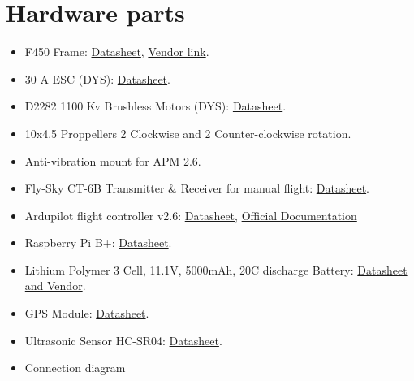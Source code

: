 \documentclass[a4paper,12pt,oneside]{book}
\begin{document}
\section{Hardware parts}
\begin{itemize}
  \item F450 Frame: \href{https://github.com/eYSIP-2016/Autonomous-Drone/blob/master/datasheets/F450.pdf}{Datasheet}, \href{http://www.amazon.in/Neewer-99035841-4-Axis-Airframe/dp/B00ATLP6WM?ie=UTF8&psc=1&redirect=true&ref_=oh_aui_detailpage_o02_s00}{Vendor link}.
  \item 30 A ESC (DYS): \href{https://github.com/eYSIP-2016/Autonomous-Drone/blob/master/datasheets/ESC.pdf}{Datasheet}.
  \item D2282 1100 Kv Brushless Motors (DYS): \href{https://github.com/eYSIP-2016/Autonomous-Drone/blob/master/datasheets/dys_D2822_motors.pdf}{Datasheet}.
  \item 10x4.5 Proppellers 2 Clockwise and 2 Counter-clockwise rotation.
  \item Anti-vibration mount for APM 2.6.
   \item Fly-Sky CT-6B Transmitter & Receiver for manual flight: \href{https://github.com/eYSIP-2016/Autonomous-Drone/blob/master/datasheets/Radio.pdf}{Datasheet}.
   \item Ardupilot flight controller v2.6: \href{https://github.com/eYSIP-2016/Autonomous-Drone/blob/master/datasheets/APM-2.6-web-version.pdf}{Datasheet}, \href{http://ardupilot.org/copter/index.html}{Official Documentation}
   \item Raspberry Pi B+: \href{https://github.com/eYSIP-2016/Autonomous-Drone/blob/master/datasheets/raspberry%20pi%20B%2B.pdf}{Datasheet}.
   \item Lithium Polymer 3 Cell, 11.1V, 5000mAh, 20C discharge Battery: \href{http://www.nex-robotics.com/products/batteries-and-chargers/lithium-polymer-3-cell-11-1v-5000mah-20c-discharge-battery.html}{Datasheet and Vendor}.
   \item GPS Module: \href{https://github.com/eYSIP-2016/Autonomous-Drone/blob/master/datasheets/AqT_GNSS%20Patch%20Module%20user%20guide%20V1.0%20(1).pdf}{Datasheet}.
    \item Ultrasonic Sensor HC-SR04: \href{https://github.com/eYSIP-2016/Autonomous-Drone/blob/master/datasheets/HCSR04.pdf}{Datasheet}.
  \item Connection diagram
\end{itemize}
\end{document}
